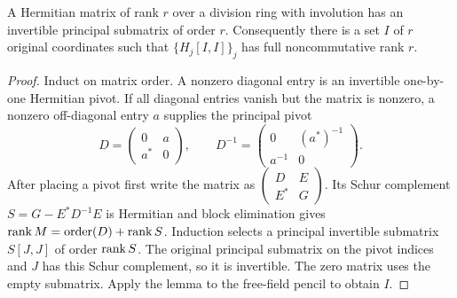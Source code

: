 \begin{lemma}\label{lem:principal}
A Hermitian matrix of rank $r$ over a division ring with involution has
an invertible principal submatrix of order $r$. Consequently there is
a set $I$ of $r$ original coordinates such that
$\{H_j[I,I]\}_j$ has full noncommutative rank $r$.
\end{lemma}
\begin{proof}
Induct on matrix order. A nonzero diagonal entry is an invertible
one-by-one Hermitian pivot. If all diagonal entries vanish but the matrix
is nonzero, a nonzero off-diagonal entry $a$ supplies the principal pivot
\[
 D=\begin{pmatrix}0&a\\a^*&0\end{pmatrix},\qquad
 D^{-1}=\begin{pmatrix}0&(a^*)^{-1}\\a^{-1}&0\end{pmatrix}.
\]
After placing a pivot first write the matrix as
$\left(\begin{smallmatrix}D&E\\E^*&G\end{smallmatrix}\right)$.
Its Schur complement $S=G-E^*D^{-1}E$ is Hermitian and block elimination
gives $\operatorname{rank} M=\operatorname{order}(D)+\operatorname{rank} S$. Induction selects a
principal invertible submatrix $S[J,J]$ of order $\operatorname{rank} S$.
The original principal submatrix on the pivot indices and $J$ has this
Schur complement, so it is invertible. The zero matrix uses the empty
submatrix. Apply the lemma to the free-field pencil to obtain $I$.
\end{proof}

